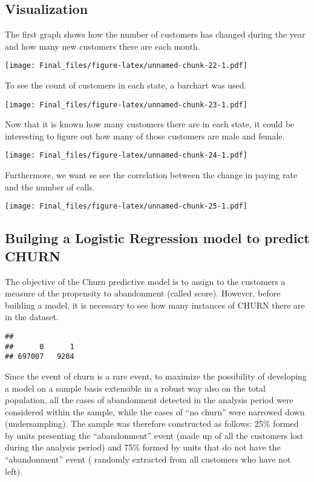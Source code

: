 \documentclass[]{article}
\newenvironment{Shaded}{\begin{snugshade}}{\end{snugshade}}
\newcommand{\KeywordTok}[1]{\textcolor[rgb]{0.13,0.29,0.53}{\textbf{#1}}}
\newcommand{\OperatorTok}[1]{\textcolor[rgb]{0.81,0.36,0.00}{\textbf{#1}}}
\newcommand{\NormalTok}[1]{#1}
\begin{document}
\subsection{Visualization}\label{visualization}

The first graph shows how the number of customers has changed during the
year and how many new customers there are each month.

\texttt{[image: Final\_files/figure-latex/unnamed-chunk-22-1.pdf]}

To see the count of customers in each state, a barchart was used.

\texttt{[image: Final\_files/figure-latex/unnamed-chunk-23-1.pdf]}

Now that it is known how many customers there are in each state, it
could be interesting to figure out how many of those customers are male
and female.

\texttt{[image: Final\_files/figure-latex/unnamed-chunk-24-1.pdf]}

Furthermore, we want se see the correlation between the change in paying
rate and the number of calls.

\texttt{[image: Final\_files/figure-latex/unnamed-chunk-25-1.pdf]}

\subsection{Builging a Logistic Regression model to predict
CHURN}\label{builging-a-logistic-regression-model-to-predict-churn}

The objective of the Churn predictive model is to assign to the
customers a measure of the propensity to abandonment (called score).
However, before building a model, it is necessary to see how many
instances of CHURN there are in the dataset.

\begin{Shaded}
\end{Shaded}

\begin{verbatim}
## 
##      0      1 
## 697007   9204
\end{verbatim}

Since the event of churn is a rare event, to maximize the possibility of
developing a model on a sample basis extensible in a robust way also on
the total population, all the cases of abandonment detected in the
analysis period were considered within the sample, while the cases of
``no churn'' were narrowed down (undersampling). The sample was
therefore constructed as follows: 25\% formed by units presenting the
``abandonment'' event (made up of all the customers lost during the
analysis period) and 75\% formed by units that do not have the
``abandonment'' event ( randomly extracted from all customers who have
not left).
\end{document}
